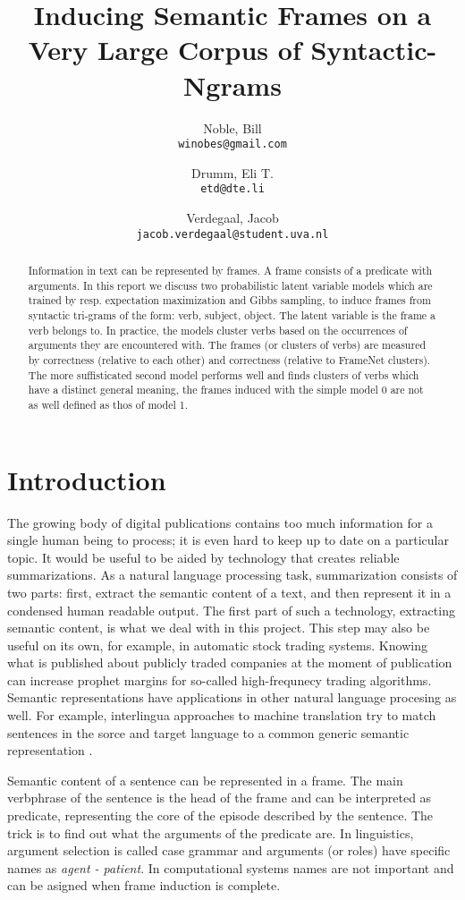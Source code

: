 \documentclass{article} %
\title{Inducing Semantic Frames on a Very Large Corpus of Syntactic-Ngrams}
\author{
    Noble, Bill\\
    \texttt{winobes@gmail.com}
    \and
    Drumm, Eli T.\\
    \texttt{etd@dte.li}
    \and
    Verdegaal, Jacob\\
    \texttt{jacob.verdegaal@student.uva.nl}
}
\begin{document}
\maketitle


\begin{abstract}
  Information in text can be represented by frames. A frame consists of a predicate with arguments. In this report we discuss two probabilistic latent variable models which are trained by resp. expectation maximization and Gibbs sampling, to induce frames from syntactic tri-grams of the form: verb, subject, object. The latent variable is the frame a verb belongs to. In practice, the models cluster verbs based on the occurrences of arguments they are encountered with. The frames (or clusters of verbs) are measured by correctness (relative to each other) and correctness (relative to FrameNet clusters). The more suffisticated second model performs well and finds clusters of verbs which have a distinct general meaning, the frames induced with the simple model 0 are not as well defined as thos of model 1. 
\end{abstract}

\section{Introduction}
The growing body of digital publications contains too much information for a single human being to process; it is even hard to keep up to date on a particular topic. It would be useful to be aided by technology that creates reliable summarizations. As a natural language processing task, summarization consists of two parts: first, extract the semantic content of a text, and then represent it in a condensed human readable output. The first part of such a technology, extracting semantic content, is what we deal with in this project. This step may also be useful on its own, for example, in automatic stock trading systems. Knowing what is published about publicly traded companies at the moment of publication can increase prophet margins for so-called high-frequnecy trading algorithms. Semantic representations have applications in other natural language procesing as well. For example, interlingua approaches to machine translation try to match sentences in the sorce and target language to a common generic semantic representation \cite{boas2005}.

Semantic content of a sentence can be represented in a frame. The main verbphrase of the sentence is the head of the frame and can be interpreted as predicate, representing the core of the episode described by the sentence. The trick is to find out what the arguments of the predicate are. In linguistics, argument selection is called case grammar \citep{dowty1991} and arguments (or roles) have specific names as \textit{agent - patient}. In computational systems names are not important and can be asigned when frame induction is complete.
\end{document}
